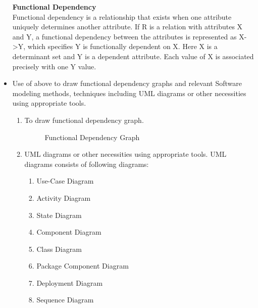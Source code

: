 \documentclass[12pt,a4paper]{report}
\begin{document}
\begin{appendices}
\begin{itemize}
	\textbf{Functional Dependency}\\
	\hspace{0.5 in}Functional dependency is a relationship that exists when one attribute uniquely determines another attribute.
	\hspace{0.5 in}If R is a relation with attributes X and Y, a functional dependency between the attributes is represented as X->Y, which specifies Y is functionally dependent on X. Here X is a determinant set and Y is a dependent attribute. Each value of X is associated precisely with one Y value.
	
	
	\item Use of above to draw functional dependency graphs and relevant Software modeling methods, techniques including UML diagrams or other
	necessities using appropriate tools.
	\begin{enumerate}
		\item To draw functional dependency graph.
		\begin{figure}[!h]
			\begin{center}
				\caption{Functional Dependency Graph}
			\end{center}
		\end{figure}
			\newpage
		\item UML diagrams or other necessities using appropriate tools.
		UML diagrams consists of following diagrams:
		\begin{enumerate}
			\item Use-Case Diagram
			\item Activity Diagram
			\item State Diagram
			\item Component Diagram
			\item Class Diagram
			\item Package Component Diagram
			\item Deployment Diagram
			\item Sequence Diagram
			
		\end{enumerate}
	\end{enumerate}


\end{itemize}
\end{appendices}
\end{document}
